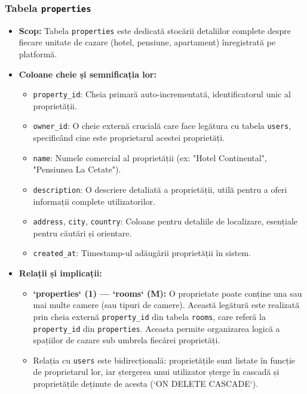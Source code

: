 \documentclass[12pt, a4paper, oneside, romanian]{teza-upb}
\begin{document}
\subsubsection{Tabela \texttt{properties}}
\begin{itemize}
	\item \textbf{Scop:} Tabela \texttt{properties} este dedicată stocării detaliilor complete despre fiecare unitate de cazare (hotel, pensiune, apartament) înregistrată pe platformă.
	\item \textbf{Coloane cheie și semnificația lor:}
	\begin{itemize}
		\item \texttt{property\_id}: Cheia primară auto-incrementată, identificatorul unic al proprietății.
		\item \texttt{owner\_id}: O cheie externă crucială care face legătura cu tabela \texttt{users}, specificând cine este proprietarul acestei proprietăți.
		\item \texttt{name}: Numele comercial al proprietății (ex: "Hotel Continental", "Pensiunea La Cetate").
		\item \texttt{description}: O descriere detaliată a proprietății, utilă pentru a oferi informații complete utilizatorilor.
		\item \texttt{address}, \texttt{city}, \texttt{country}: Coloane pentru detaliile de localizare, esențiale pentru căutări și orientare.
		\item \texttt{created\_at}: Timestamp-ul adăugării proprietății în sistem.
	\end{itemize}
	\item \textbf{Relații și implicații:}
	\begin{itemize}
		\item \textbf{`properties` (1) --- `rooms` (M):} O proprietate poate conține una sau mai multe camere (sau tipuri de camere). Această legătură este realizată prin cheia externă \texttt{property\_id} din tabela \texttt{rooms}, care referă la \texttt{property\_id} din \texttt{properties}. Aceasta permite organizarea logică a spațiilor de cazare sub umbrela fiecărei proprietăți.
		\item Relația cu \texttt{users} este bidirecțională: proprietățile sunt listate în funcție de proprietarul lor, iar ștergerea unui utilizator șterge în cascadă și proprietățile deținute de acesta (`ON DELETE CASCADE`).
	\end{itemize}
\end{itemize}
\end{document}
